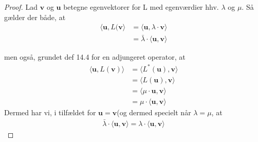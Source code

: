 \documentclass[paper=a4, fontsize=11pt]{scrartcl} %
\begin{document}
			\begin{proof} Lad $\mathbf{v}$ og $\mathbf{u}$ betegne egenvektorer for L med egenværdier hhv. $\lambda$ og $\mu$. Så gælder der både, at
				\begin{align*}
				\langle \mathbf{u},L(\mathbf{v}\rangle&=\langle\mathbf{u},\lambda\cdot\mathbf{v}\rangle\\
				&=\bar{\lambda}\cdot\langle\mathbf{u},\mathbf{v}\rangle
				\end{align*}
				
				men også, grundet def 14.4 for en adjungeret operator, at
				\begin{align*}
				\langle\mathbf{u},L(\mathbf{v})\rangle&=\langle L^*(\mathbf{u}),\mathbf{v}\rangle \\
				&=\langle L(\mathbf{u}),\mathbf{v}\rangle \\
				&=\langle \mu\cdot\mathbf{u},\mathbf{v}\rangle \\
				&=\mu \cdot \langle\mathbf{u},\mathbf{v}\rangle 
				\end{align*}
				Dermed har vi, i tilfældet for $\mathbf{u}=\mathbf{v}$(og dermed specielt når $\lambda=\mu$, at
				\begin{align*}
				\bar{\lambda}\cdot\langle\mathbf{u},\mathbf{v}\rangle=\lambda\cdot\langle\mathbf{u},\mathbf{v}\rangle
				\end{align*}
			\end{proof}
			
\end{document}
